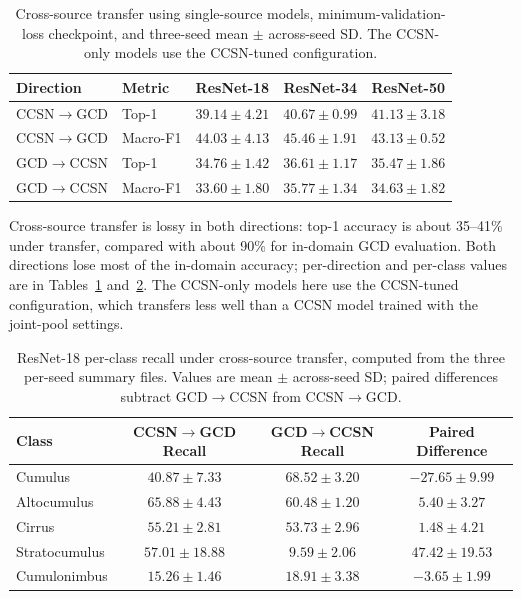 \documentclass[11pt,a4paper]{article}
\begin{document}
\begin{table}[!htbp]
\centering
\setlength{\tabcolsep}{8pt}
\begin{tabular}{llccc}
\toprule
\textbf{Direction} & \textbf{Metric} & \textbf{ResNet-18} & \textbf{ResNet-34} & \textbf{ResNet-50} \\
\midrule
CCSN$\to$GCD & Top-1 & $39.14 \pm 4.21$ & $40.67 \pm 0.99$ & $41.13 \pm 3.18$ \\
CCSN$\to$GCD & Macro-F1 & $44.03 \pm 4.13$ & $45.46 \pm 1.91$ & $43.13 \pm 0.52$ \\
GCD$\to$CCSN & Top-1 & $34.76 \pm 1.42$ & $36.61 \pm 1.17$ & $35.47 \pm 1.86$ \\
GCD$\to$CCSN & Macro-F1 & $33.60 \pm 1.80$ & $35.77 \pm 1.34$ & $34.63 \pm 1.82$ \\
\bottomrule
\end{tabular}
\caption{Cross-source transfer using single-source models, minimum-validation-loss checkpoint, and three-seed mean $\pm$ across-seed SD. The CCSN-only models use the CCSN-tuned configuration.}
\label{tab:transfer_summary}
\end{table}

Cross-source transfer is lossy in both directions: top-1 accuracy is about 35--41\% under transfer, compared with about 90\% for in-domain GCD evaluation. Both directions lose most of the in-domain accuracy; per-direction and per-class values are in Tables~\ref{tab:transfer_summary} and~\ref{tab:transfer_per_class}. The CCSN-only models here use the CCSN-tuned configuration, which transfers less well than a CCSN model trained with the joint-pool settings.

\begin{table}[!htbp]
\centering
\small
\setlength{\tabcolsep}{7pt}
\begin{tabular}{lccc}
\toprule
\textbf{Class} & \textbf{CCSN$\to$GCD Recall} & \textbf{GCD$\to$CCSN Recall} & \textbf{Paired Difference} \\
\midrule
Cumulus & $40.87 \pm 7.33$ & $68.52 \pm 3.20$ & $-27.65 \pm 9.99$ \\
Altocumulus & $65.88 \pm 4.43$ & $60.48 \pm 1.20$ & $5.40 \pm 3.27$ \\
Cirrus & $55.21 \pm 2.81$ & $53.73 \pm 2.96$ & $1.48 \pm 4.21$ \\
Stratocumulus & $57.01 \pm 18.88$ & $9.59 \pm 2.06$ & $47.42 \pm 19.53$ \\
Cumulonimbus & $15.26 \pm 1.46$ & $18.91 \pm 3.38$ & $-3.65 \pm 1.99$ \\
\bottomrule
\end{tabular}
\caption{ResNet-18 per-class recall under cross-source transfer, computed from the three per-seed summary files. Values are mean $\pm$ across-seed SD; paired differences subtract GCD$\to$CCSN from CCSN$\to$GCD.}
\label{tab:transfer_per_class}
\end{table}
\end{document}
